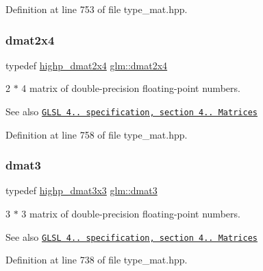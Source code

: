 Definition at line 753 of file type\+\_\+mat.\+hpp.

\mbox{\label{group__core__types_ga2d1dd4b4925d1ea67539902c820483a0}} 
\subsubsection{\texorpdfstring{dmat2x4}{dmat2x4}}
{\footnotesize\ttfamily typedef \hyperlink{group__core__precision_gacd51d8188f7d66a83c035b8c4cd69f2d}{highp\+\_\+dmat2x4} \hyperlink{group__core__types_ga2d1dd4b4925d1ea67539902c820483a0}{glm\+::dmat2x4}}

2 $\ast$ 4 matrix of double-\/precision floating-\/point numbers.

\begin{DoxySeeAlso}{See also}
\href{http://www.opengl.org/registry/doc/GLSLangSpec.4.20.8.pdf}{\tt G\+L\+SL 4.. specification, section 4.. Matrices} 
\end{DoxySeeAlso}


Definition at line 758 of file type\+\_\+mat.\+hpp.

\mbox{\label{group__core__types_ga25fd62195c3ef5ac0d32ead1dbfbb929}} 
\subsubsection{\texorpdfstring{dmat3}{dmat3}}
{\footnotesize\ttfamily typedef \hyperlink{group__core__precision_gad7229dea82287910d88e6e8566e39fc7}{highp\+\_\+dmat3x3} \hyperlink{group__core__types_ga25fd62195c3ef5ac0d32ead1dbfbb929}{glm\+::dmat3}}

3 $\ast$ 3 matrix of double-\/precision floating-\/point numbers.

\begin{DoxySeeAlso}{See also}
\href{http://www.opengl.org/registry/doc/GLSLangSpec.4.20.8.pdf}{\tt G\+L\+SL 4.. specification, section 4.. Matrices} 
\end{DoxySeeAlso}


Definition at line 738 of file type\+\_\+mat.\+hpp.

\mbox{\label{group__core__types_ga2db259d2e7921065c5b7d4dca9547960}} 
